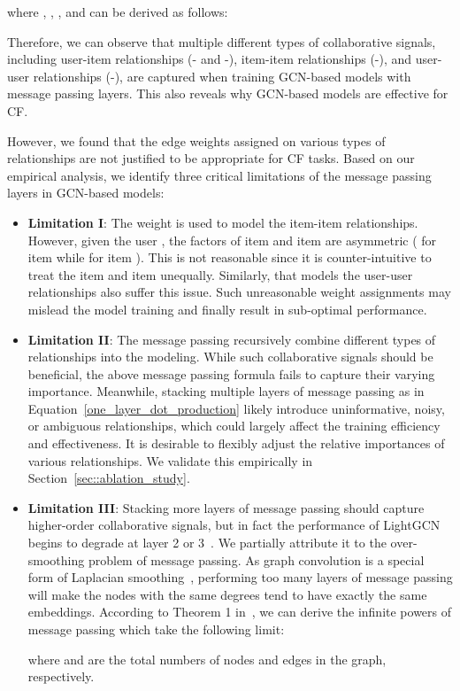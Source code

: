 \documentclass[sigconf,authorversion]{acmart}
\begin{document}
where , , , and  can be derived as follows:

Therefore, we can observe that multiple different types of collaborative signals, including user-item relationships (- and -), item-item relationships (-), and user-user relationships (-), are captured when training GCN-based models with message passing layers. 
This also reveals why GCN-based models are effective for CF. 

However, we found that the edge weights assigned on various types of relationships are not justified to be appropriate for CF tasks. Based on our empirical analysis, we identify three critical limitations of the message passing layers in GCN-based models: 
\begin{itemize}
	\item \textbf{Limitation I}: The weight  is used to model the item-item relationships. However, given the user , the factors of item  and item  are asymmetric ( for item  while  for item ). This is not reasonable since it is counter-intuitive to treat the item  and item  unequally. 
	Similarly,  that models the user-user relationships also suffer this issue. Such unreasonable weight assignments may mislead the model training and finally result in sub-optimal performance.
	\item \textbf{Limitation II}: The message passing recursively combine different types of relationships into the modeling. While such collaborative signals should be beneficial, the above message passing formula fails to capture their varying importance. Meanwhile, stacking multiple layers of message passing as in Equation~\ref{one_layer_dot_production} likely introduce uninformative, noisy, or ambiguous relationships, which could largely affect the training efficiency and effectiveness. It is desirable to flexibly adjust the relative importances of various relationships. We validate this empirically in Section~\ref{sec::ablation_study}.
    \item \textbf{Limitation III}: Stacking more layers of message passing should capture higher-order collaborative signals, but in fact the performance of LightGCN begins to degrade at layer 2 or 3~\cite{LightGCN}. We partially attribute it to the over-smoothing problem of message passing. As graph convolution is a special form of Laplacian smoothing~\cite{deeper_insights_GCN}, performing too many layers of message passing will make the nodes with the same degrees tend to have exactly the same embeddings. According to Theorem 1 in~\cite{GCNII}, we can derive the infinite powers of message passing which take the following limit:
    
    where  and  are the total numbers of nodes and edges in the graph, respectively.
        





\end{itemize}
\end{document}
